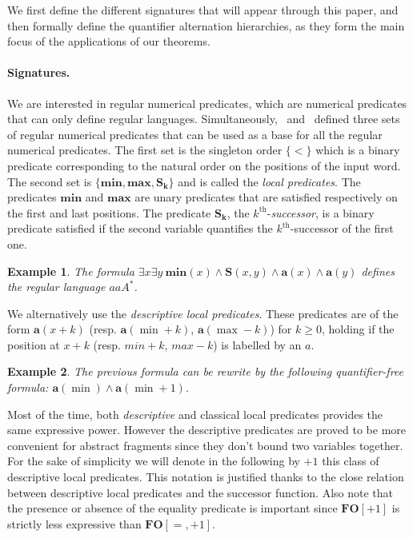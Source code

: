 \documentclass[submission,hidelink]{dmtcs-episciences}
\newtheorem{example}{Example}
\renewcommand{\geq}{\geqslant}
\newcommand{\FO}{\mathbf{FO}}
\begin{document}
	We first define the different signatures that will appear through this paper,
	and then formally define the quantifier alternation hierarchies, as they form the main focus of the applications of our theorems.



\paragraph{Signatures.}
	We are interested in regular numerical predicates, which are numerical predicates that can only define regular languages.
	Simultaneously,~\cite{Straubing94} and~\cite{Pel92}  defined three sets of regular numerical predicates that can be used as a base for all the regular numerical predicates.
	The first set is the singleton order $\{<\}$ which is a binary predicate corresponding to the natural order on the positions of the input word.
	The second set is $\{\mathbf{min},\mathbf{max},\mathbf{S_k}\}$ and is called the \emph{local predicates}.
	The predicates $\mathbf{min}$ and $\mathbf{max}$ are unary predicates that are satisfied respectively on the first and last positions.
	The predicate $\mathbf{S_k}$, the $k^{\text{th}}$-\emph{successor}, is a binary predicate satisfied if the second variable quantifies the
	$k^{\text{th}}$-successor of the first one.

	\begin{example}
		The formula $\exists x\exists y \ \mathbf{min}(x)\land \mathbf{S}(x,y) \land \mathbf a(x) \land \mathbf a(y)$
		defines the regular language $aaA^*$.
	\end{example}
	We alternatively use the \emph{descriptive local predicates}.
	These predicates are of the form
	$\mathbf{a}(x+k)$ (resp. $\mathbf{a}(\min+k)$, $\mathbf{a}(\max-k)$) for $k\geq 0$, holding if the position at $x+k$ (resp. $min+k$, $max-k$) is labelled by an $a$.
	\begin{example}
		The previous formula can be rewrite by the following quantifier-free formula: $\mathbf{a}(\min)\land \mathbf{a}(\min+1)$.
	\end{example}
	Most of the time, both \emph{descriptive} and classical local predicates provides the same expressive power. However the descriptive
	predicates are proved to be more convenient for abstract fragments since they don't bound two variables together. For the sake of
	simplicity we will denote in the following by $+1$ this class of descriptive local predicates. This notation is justified thanks to
	the close relation between descriptive local predicates and the successor function.
	Also note that the presence or absence of the equality predicate is important since $\FO[+1]$ is strictly less expressive than
	$\FO[=,+1]$.
\end{document}
